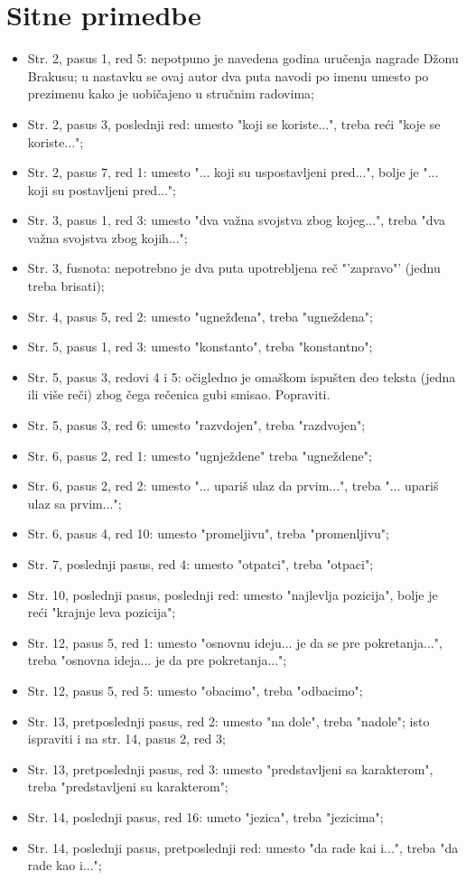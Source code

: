 \documentclass[a4paper]{report}
\begin{document}
\section{Sitne primedbe}
\begin{itemize}
  \item Str. 2, pasus 1, red 5: nepotpuno je navedena godina uručenja nagrade Džonu Brakusu; u nastavku se ovaj autor dva puta navodi po imenu umesto po prezimenu kako je uobičajeno u stručnim radovima;
  \item Str. 2, pasus 3, poslednji red: umesto "koji se koriste...", treba reći "koje se koriste...";
   \item Str. 2, pasus 7, red 1: umesto "... koji su uspostavljeni pred...", bolje je "... koji su postavljeni pred..."; 
   \item Str. 3, pasus 1, red 3: umesto "dva važna svojstva zbog kojeg...", treba "dva važna svojstva zbog kojih...";
   \item Str. 3, fusnota: nepotrebno je dva puta upotrebljena reč "'zapravo"' (jednu treba brisati);
   \item Str. 4, pasus 5, red 2: umesto "ugnežđena", treba "ugneždena";
   \item Str. 5, pasus 1, red 3: umesto "konstanto", treba "konstantno";
   \item Str. 5, pasus 3, redovi 4 i 5: očigledno je omaškom ispušten deo teksta (jedna ili više reči) zbog čega rečenica gubi smisao. Popraviti.
   \item Str. 5, pasus 3, red 6: umesto "razvdojen", treba "razdvojen";
   \item Str. 6, pasus 2, red 1: umesto "ugnježdene" treba "ugneždene";
   \item Str. 6, pasus 2, red 2: umesto "... upariš ulaz da prvim...", treba "... upariš ulaz sa prvim...";
   \item Str. 6, pasus 4, red 10: umesto "promeljivu", treba "promenljivu";
   \item Str. 7, poslednji pasus, red 4: umesto "otpatci", treba "otpaci";
   \item Str. 10, poslednji pasus, poslednji red: umesto "najlevlja pozicija", bolje je reći "krajnje leva pozicija";
   \item Str. 12, pasus 5, red 1: umesto "osnovnu ideju... je da se pre pokretanja...", treba "osnovna ideja... je da pre pokretanja...";
   \item Str. 12, pasus 5, red 5: umesto "obacimo", treba "odbacimo";
   \item Str. 13, pretposlednji pasus, red 2: umesto "na dole", treba "nadole"; isto ispraviti i na str. 14, pasus 2, red 3;
   \item Str. 13, pretposlednji pasus, red 3: umesto "predstavljeni sa karakterom", treba "predstavljeni su karakterom";
   \item Str. 14, poslednji pasus, red 16: umeto "jezica", treba "jezicima";
   \item Str. 14, poslednji pasus, pretposlednji red: umesto "da rade kai i...", treba "da rade kao i...";      
\end{itemize}
\end{document}
